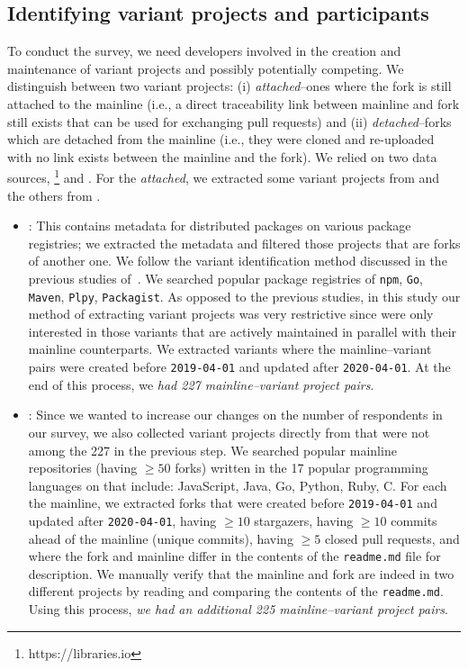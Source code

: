 

\subsection{Identifying variant projects and participants}
\label{sec:forks_and_participants}
To conduct the survey, we need developers involved in the creation and maintenance of variant projects and possibly potentially competing. We distinguish between two variant projects: (i) \emph{attached}--ones where the fork is still attached to the mainline (i.e., a direct traceability link between mainline and fork still exists that can be used for exchanging pull requests) and (ii) \emph{detached}--forks which are detached from the mainline (i.e., they were cloned and re-uploaded with no link exists between the mainline and the fork).
We relied on two data sources, \librariesio\footnote{https://libraries.io} and \gh.
For the \emph{attached}, we extracted some variant projects from \librariesio and the others from \gh.
\begin{itemize}
\item \librariesio: This contains metadata for distributed packages on various package registries; we extracted the metadata and filtered those projects that are forks of another one. We follow the variant identification method discussed in the previous studies of~\cite{businge:emse:2021,businge:benevol:2020}. We searched popular package registries of \texttt{npm}, \texttt{Go}, \texttt{Maven}, \texttt{Plpy}, \texttt{Packagist}.
As opposed to the previous studies, in this study our method of extracting variant projects was very restrictive since were only interested in those variants that are actively maintained in parallel with their mainline counterparts. We extracted variants where the mainline--variant pairs were created before \texttt{2019-04-01} and updated after \texttt{2020-04-01}.
At the end of this process, we \textit{had 227 mainline–variant project pairs}.

\item \gh: Since we wanted to increase our changes on the number of respondents in our survey, we also collected variant projects directly from \gh that were not among the 227 in the previous step. We searched popular mainline repositories (having $\geq 50$ forks) written in the 17 popular programming languages on \gh that include: JavaScript, Java, Go, Python, Ruby, C. For each the mainline, we extracted forks that were created before \texttt{2019-04-01} and updated after \texttt{2020-04-01}, having $\geq 10$ stargazers, having $\geq 10$ commits ahead of the mainline (unique commits), having $\geq 5$ closed pull requests, and where the fork and mainline differ in the contents of the \texttt{readme.md} file for description. We manually verify that the mainline and fork are indeed in two different projects by reading and comparing the contents of the \texttt{readme.md}. Using this process, \textit{we had an additional 225 mainline–variant project pairs}.
\end{itemize}

